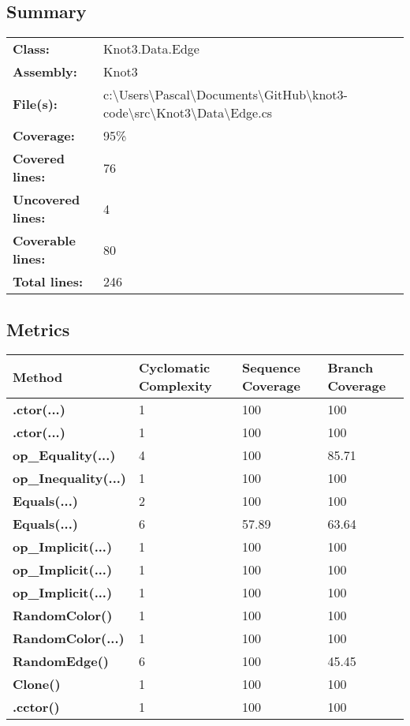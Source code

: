\documentclass[a4paper,10pt]{article}
\begin{document}
\subsection{Summary}
\begin{longtable}[l]{ll}
\textbf{Class:} & Knot3.Data.Edge\\
\textbf{Assembly:} & Knot3\\
\textbf{File(s):} & \begin{minipage}[t]{12cm}{c:\textbackslash Users\textbackslash Pascal\textbackslash Documents\textbackslash GitHub\textbackslash knot3-code\textbackslash src\textbackslash Knot3\textbackslash Data\textbackslash Edge.cs}\end{minipage} \\
\textbf{Coverage:} & 95\%\\
\textbf{Covered lines:} & 76\\
\textbf{Uncovered lines:} & 4\\
\textbf{Coverable lines:} & 80\\
\textbf{Total lines:} & 246\\
\end{longtable}
\subsection{Metrics}
\begin{longtable}[l]{|l|l|l|l|}
\hline
\textbf{Method} & \textbf{Cyclomatic Complexity} & \textbf{Sequence Coverage} & \textbf{Branch Coverage}\\
\hline
\textbf{.ctor(...)} & 1 & 100 & 100\\
\hline
\textbf{.ctor(...)} & 1 & 100 & 100\\
\hline
\textbf{op\_Equality(...)} & 4 & 100 & 85.71\\
\hline
\textbf{op\_Inequality(...)} & 1 & 100 & 100\\
\hline
\textbf{Equals(...)} & 2 & 100 & 100\\
\hline
\textbf{Equals(...)} & 6 & 57.89 & 63.64\\
\hline
\textbf{op\_Implicit(...)} & 1 & 100 & 100\\
\hline
\textbf{op\_Implicit(...)} & 1 & 100 & 100\\
\hline
\textbf{op\_Implicit(...)} & 1 & 100 & 100\\
\hline
\textbf{RandomColor()} & 1 & 100 & 100\\
\hline
\textbf{RandomColor(...)} & 1 & 100 & 100\\
\hline
\textbf{RandomEdge()} & 6 & 100 & 45.45\\
\hline
\textbf{Clone()} & 1 & 100 & 100\\
\hline
\textbf{.cctor()} & 1 & 100 & 100\\
\hline
\end{longtable}
\end{document}
